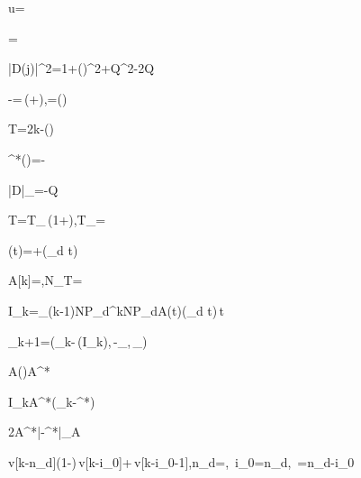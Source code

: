 u=



=

\left|D(j\omega)\right|^2=1+(\omega\tau)^2+Q^2-2Q\left[\cos\theta-\omega\tau\sin\theta\right]

\cos\theta-\omega\tau\sin\theta=\,\cos\left(\theta+\varphi\right),\quad \varphi=\arctan(\omega\tau)

\omega T=2\pi k-\arctan(\omega\tau)

\delta^{*}(\omega)=-\frac{\arctan(\omega\tau)}{2\pi}

\left|D\right|_{\min}=-Q

T=T_{}\,(1+\delta),\quad T_{}=

\delta(t)=\hat{\delta}+\Delta\sin(\omega_d t)

A[k]=,\quad N_T=

I_k=\int_{(k-1)NP_d}^{kNP_d}A(t)\sin(\omega_d t)\,t

\hat{\delta}_{k+1}=\left(\hat{\delta}_k-\sigma\,(I_k),\,-\delta_{\max},\,\delta_{\max}\right)

A(\delta)\approx A^{*}

I_k\kappa A^{*}\left(\hat{\delta}_k-\delta^{*}\right)\Delta

2\kappa A^{*}\sigma\left|\hat{\delta}-\delta^{*}\right|\ge\eta_A

v[k-n_d]\approx(1-\lambda)\,v[k-i_0]+\lambda\,v[k-i_0-1],\quad n_d=,\ i_0=\lfloor n_d\rfloor,\ \lambda=n_d-i_0

